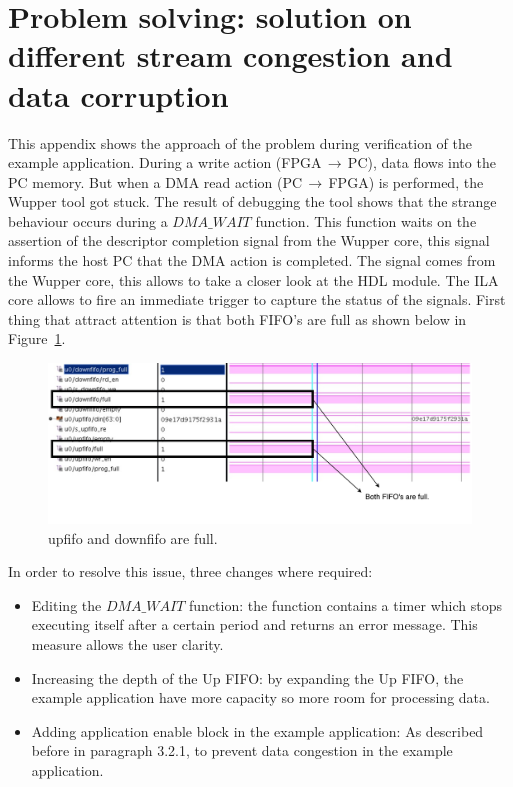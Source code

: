 \newpage

\section{Problem solving: solution on different stream congestion and data corruption}

This appendix shows the approach of the problem during verification of the example application. During a write action (FPGA$\,\to\,$PC), data flows into the PC memory. But when a DMA read action (PC$\,\to\,$FPGA) is performed, the Wupper tool got stuck. The result of debugging the tool shows that the strange behaviour occurs during a $DMA\_WAIT$ function. This function waits on the assertion of the descriptor completion signal from the Wupper core, this signal informs the host PC that the DMA action is completed. The signal comes from the Wupper core, this allows to take a closer look at the HDL module.
The ILA core allows to fire an immediate trigger to capture the status of the signals. First thing that attract attention is that both FIFO's are full as shown below in Figure~\ref{fig:fifofull}.

\begin{figure}[h]
	
	\centering
	\includegraphics[width = 1 \textwidth]{figures/fifos_full.pdf}	
	\caption{upfifo and downfifo are full.}
	\label{fig:fifofull}
\end{figure}


 In order to resolve this issue, three changes where required:

\begin{itemize}
	\item Editing the $DMA\_WAIT$ function: the function contains a timer which stops executing itself after a certain period and returns an error message. This measure allows the user clarity. 
	
	\item Increasing the depth of the Up FIFO: by expanding the Up FIFO, the example application have more capacity so more room for processing data.
	
	\item Adding application enable block in the example application: As described before in paragraph 3.2.1, to prevent data congestion in the example application.

\end{itemize}
 


